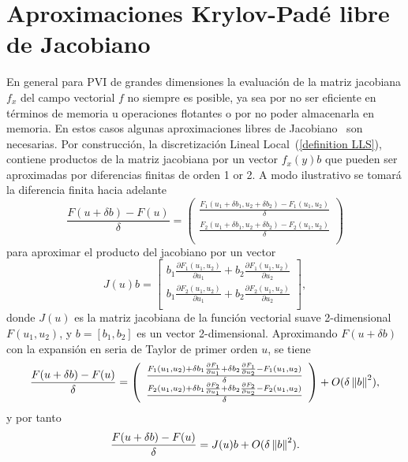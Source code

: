 \section{Aproximaciones Krylov-Padé libre de Jacobiano}\label{section:fj-krylov-pade-approx}
En general para PVI de grandes dimensiones la evaluación de la matriz jacobiana $f_x$ del campo vectorial $f$ no siempre es posible, ya sea por no ser eficiente en términos de memoria u operaciones flotantes o por no poder almacenarla en memoria. En estos casos algunas aproximaciones libres de Jacobiano~\cite{al2009complex,knoll2004jacobian} son necesarias. Por construcción, la discretización Lineal Local~(\ref{definition LLS}), contiene productos de la matriz jacobiana por un vector $f_x(y)b$ que pueden ser aproximadas por diferencias finitas de orden 1 or 2. A modo ilustrativo se tomará la diferencia finita hacia adelante
\begin{equation*}
	\frac{F(u+\delta b)-F(u)}{\delta} =  \left(\begin{array}{c}
		\frac{F_1(u_1+\delta b_1,u_2+\delta b_2)-F_1(u_1,u_2)}{\delta}\\
		\frac{F_2(u_1+\delta b_1,u_2+\delta b_2)-F_2(u_1,u_2)}{\delta}\\
	\end{array}\right)
\end{equation*}
para aproximar el producto del jacobiano por un vector \begin{equation*}
	J(u)b = \left[\begin{array}{c}
		b_1\frac{\partial F_1(u_1,u_2)}{\partial u_1} + b_2\frac{\partial F_1(u_1,u_2)}{\partial u_2}\\
		b_1\frac{\partial F_2(u_1,u_2)}{\partial u_1} + b_2\frac{\partial F_2(u_1,u_2)}{\partial u_2}\\
	\end{array}\right],
\end{equation*}
donde $J(u)$ es la matriz jacobiana de la función vectorial suave 2-dimensional $F(u_1,u_2)$, y $b=[b_1,b_2]$ es un vector 2-dimensional. Aproximando $F(u+\delta b)$ con la expansión en seria de Taylor de primer orden $u$, se tiene
\begin{equation*}
	\frac{F(u+\delta b)-F(u)}{\delta} =  \left(\begin{array}{c}
		\frac{F_1(u_1,u_2) + \delta b_1 \frac{\partial F_1}{\partial u_1} + \delta b_2 \frac{\partial F_1}{\partial u_2} -F_1(u_1,u_2)}{\delta}\\
		\frac{F_2(u_1,u_2) + \delta b_1 \frac{\partial F_2}{\partial u_1} + \delta b_2 \frac{\partial F_2}{\partial u_2} -F_2(u_1,u_2)}{\delta}\\
	\end{array}\right)  + O(\delta\left\lVert b \right\rVert^2),
\end{equation*}
y por tanto
\begin{equation*}
	\frac{F(u+\delta b)-F(u)}{\delta} =  J(u)b + O(\delta\left\lVert b \right\rVert^2).
\end{equation*}

